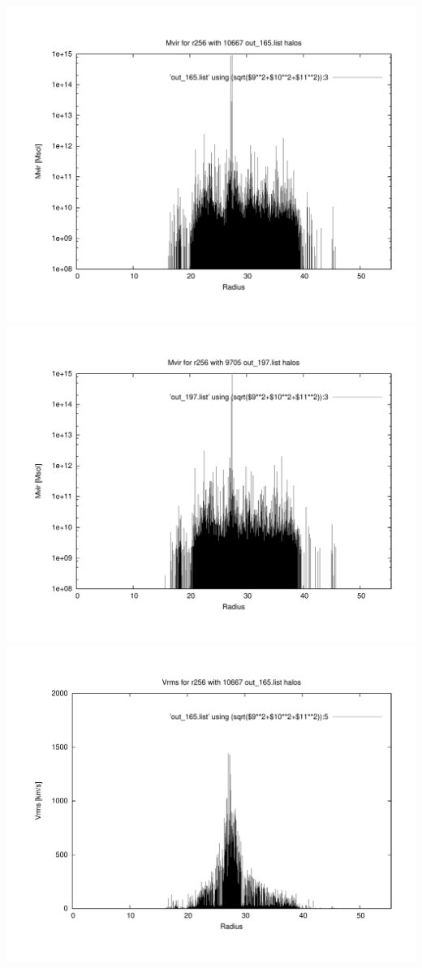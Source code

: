 \includegraphics[scale=0.3]{r256/h70/mm_h/plot_mvir_out_165.pdf}
\includegraphics[scale=0.3]{r256/h70/mm_h/plot_mvir_out_197.pdf}
\includegraphics[scale=0.3]{r256/h70/mm_h/plot_Vrms_out_165.pdf}
